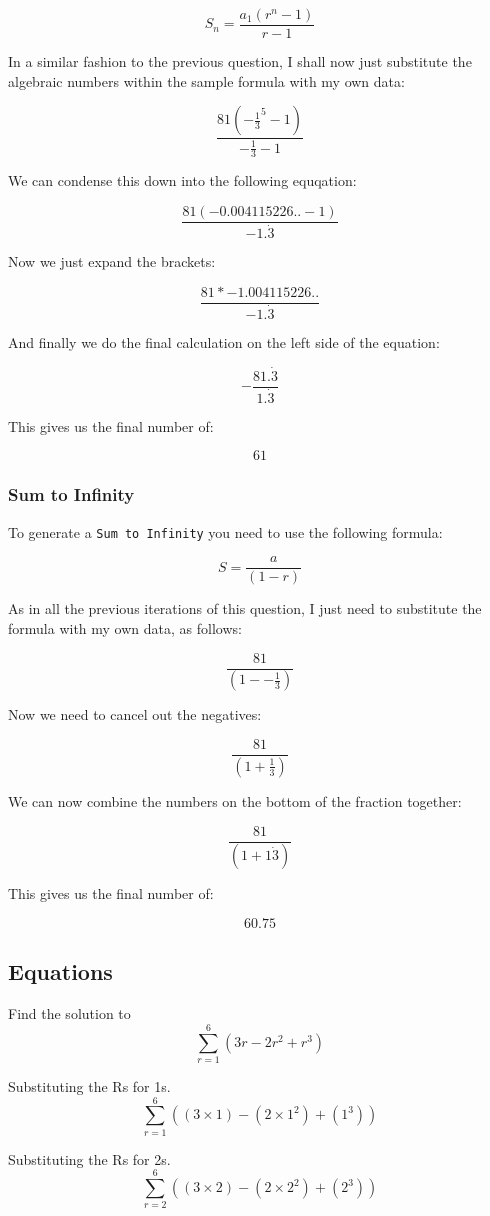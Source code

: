 \documentclass[a4paper,12pt]{article}
\begin{document}
$$S_n = \frac{a_1(r^n-1)}{r-1}$$

In a similar fashion to the previous question, I shall now just substitute the algebraic numbers within the sample formula with my own data:

$$\frac{81(-\frac{1}{3}^5-1)}{-\frac{1}{3}-1}$$

We can condense this down into the following equqation:

$$\frac{81(-0.004115226..-1)}{-1.\dot{3}}$$

Now we just expand the brackets:

$$\frac{81 * -1.004115226..}{-1.\dot{3}}$$

And finally we do the final calculation on the left side of the equation:

$$-\frac{81.\dot{3}}{1.\dot{3}}$$

This gives us the final number of:

$$61$$

\newpage

\subsubsection{Sum to Infinity}
To generate a \texttt{Sum to Infinity} you need to use the following formula:

$$S = \frac{a}{(1-r)}$$

As in all the previous iterations of this question, I just need to substitute the formula with my own data, as follows:

$$\frac{81}{(1--\frac{1}{3})}$$

Now we need to cancel out the negatives:

$$\frac{81}{(1+\frac{1}{3})}$$

We can now combine the numbers on the bottom of the fraction together:

$$\frac{81}{(1+1\dot{3})}$$

This gives us the final number of:

$$60.75$$

\newpage

\subsection{Equations}
Find the solution to
$$\sum_{r=1}^6 (3r - 2r^2 + r^3)$$

Substituting the Rs for 1s.
$$\sum_{r=1}^6 ((3 \times 1) - (2 \times 1^2) + (1^3))$$

Substituting the Rs for 2s.
$$\sum_{r=2}^6 ((3 \times 2) - (2 \times 2^2) + (2^3))$$
\end{document}
